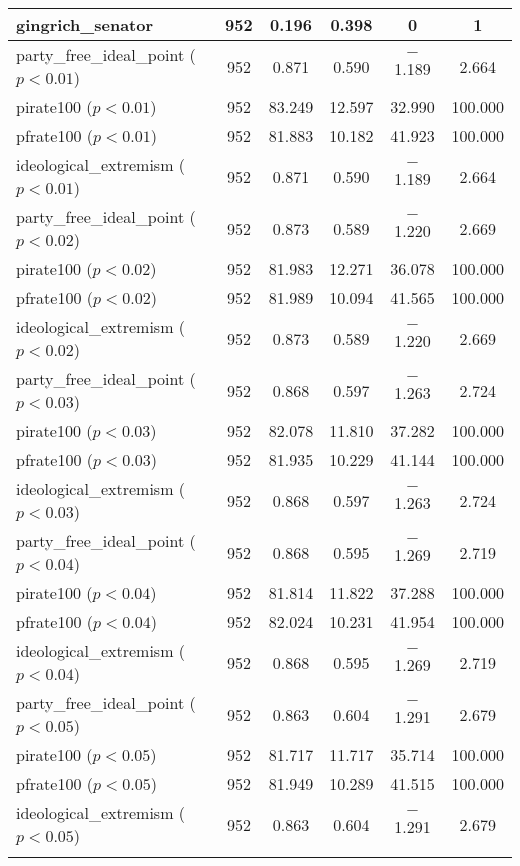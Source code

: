 \documentclass[12pt]{article}
\begin{document}
\begin{table}[ht]
\begin{tabular}{@{\extracolsep{5pt}}lccccc}
		gingrich\_senator & 952 & 0.196 & 0.398 & 0 & 1 \\ 
		\hline
		party\_free\_ideal\_point ($ p < 0.01 $) & 952 & 0.871 & 0.590 & $-$1.189 & 2.664 \\ 
		pirate100 ($ p < 0.01 $) & 952 & 83.249 & 12.597 & 32.990 & 100.000 \\ 
		pfrate100 ($ p < 0.01 $) & 952 & 81.883 & 10.182 & 41.923 & 100.000 \\ 
		ideological\_extremism ($ p < 0.01 $) & 952 & 0.871 & 0.590 & $-$1.189 & 2.664 \\ 
		\hline
		party\_free\_ideal\_point ($ p < 0.02 $) & 952 & 0.873 & 0.589 & $-$1.220 & 2.669 \\ 
		pirate100 ($ p < 0.02 $) & 952 & 81.983 & 12.271 & 36.078 & 100.000 \\ 
		pfrate100 ($ p < 0.02 $) & 952 & 81.989 & 10.094 & 41.565 & 100.000 \\ 
		ideological\_extremism ($ p < 0.02 $) & 952 & 0.873 & 0.589 & $-$1.220 & 2.669 \\ 
		\hline 
		party\_free\_ideal\_point ($ p < 0.03 $) & 952 & 0.868 & 0.597 & $-$1.263 & 2.724 \\ 
		pirate100 ($ p < 0.03 $) & 952 & 82.078 & 11.810 & 37.282 & 100.000 \\ 
		pfrate100 ($ p < 0.03 $) & 952 & 81.935 & 10.229 & 41.144 & 100.000 \\ 
		ideological\_extremism ($ p < 0.03 $) & 952 & 0.868 & 0.597 & $-$1.263 & 2.724 \\ 
		\hline
		party\_free\_ideal\_point ($ p < 0.04 $) & 952 & 0.868 & 0.595 & $-$1.269 & 2.719 \\ 
		pirate100 ($ p < 0.04 $) & 952 & 81.814 & 11.822 & 37.288 & 100.000 \\ 
		pfrate100 ($ p < 0.04 $) & 952 & 82.024 & 10.231 & 41.954 & 100.000 \\ 
		ideological\_extremism ($ p < 0.04 $) & 952 & 0.868 & 0.595 & $-$1.269 & 2.719 \\ 
		\hline
		party\_free\_ideal\_point ($ p < 0.05 $) & 952 & 0.863 & 0.604 & $-$1.291 & 2.679 \\ 
		pirate100 ($ p < 0.05 $) & 952 & 81.717 & 11.717 & 35.714 & 100.000 \\ 
		pfrate100 ($ p < 0.05 $) & 952 & 81.949 & 10.289 & 41.515 & 100.000 \\ 
		ideological\_extremism ($ p < 0.05 $) & 952 & 0.863 & 0.604 & $-$1.291 & 2.679 \\ 
		\hline \\[-1.8ex] 
	\end{tabular} 
\end{table} 
\end{document}
